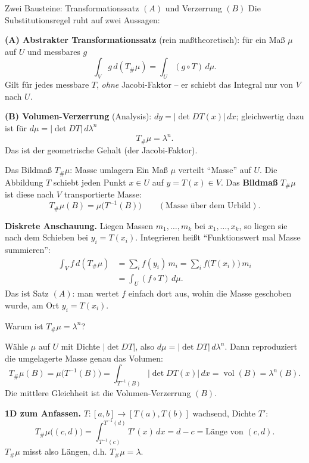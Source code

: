 \documentclass{beamer}
\begin{document}
\begin{frame}{Zwei Bausteine: Transformationssatz \((A)\) und Verzerrung \((B)\)}
Die Substitutionsregel ruht auf zwei Aussagen:

\smallskip
\textbf{(A) Abstrakter Transformationssatz} (rein maßtheoretisch): für ein Maß \(\mu\) auf \(U\) und messbares \(g\)
\[
\int_V g\,d(T_\#\mu)=\int_U (g\circ T)\,d\mu.
\]
Gilt für jedes messbare \(T\), \emph{ohne} Jacobi-Faktor -- er schiebt das Integral nur von \(V\) nach \(U\).

\smallskip
\textbf{(B) Volumen-Verzerrung} (Analysis): \(dy=|\det DT(x)|\,dx\); gleichwertig dazu ist für \(d\mu=|\det DT|\,d\lambda^n\)
\[
T_\#\mu=\lambda^n.
\]
Das ist der geometrische Gehalt (der Jacobi-Faktor).
\end{frame}

\begin{frame}{Das Bildmaß \(T_\#\mu\): Masse umlagern}
Ein Maß \(\mu\) verteilt ``Masse'' auf \(U\). Die Abbildung \(T\) schiebt jeden Punkt \(x\in U\) auf \(y=T(x)\in V\). Das \textbf{Bildmaß} \(T_\#\mu\) ist diese nach \(V\) transportierte Masse:
\[
T_\#\mu(B)=\mu\big(T^{-1}(B)\big)\qquad(\text{Masse über dem Urbild}).
\]

\smallskip
\textbf{Diskrete Anschauung.} Liegen Massen \(m_1,\dots,m_k\) bei \(x_1,\dots,x_k\), so liegen sie nach dem Schieben bei \(y_i=T(x_i)\). Integrieren heißt ``Funktionswert mal Masse summieren'':
\[
\begin{aligned}
\int_V f\,d(T_\#\mu)&=\sum_i f(y_i)\,m_i=\sum_i f\big(T(x_i)\big)\,m_i\\
&=\int_U (f\circ T)\,d\mu.
\end{aligned}
\]
Das ist Satz \((A)\): man wertet \(f\) einfach dort aus, wohin die Masse geschoben wurde, am Ort \(y_i=T(x_i)\).
\end{frame}

\begin{frame}{Warum ist \(T_\#\mu=\lambda^n\)?}
{\small
Wähle \(\mu\) auf \(U\) mit Dichte \(|\det DT|\), also \(d\mu=|\det DT|\,d\lambda^n\). Dann reproduziert die umgelagerte Masse genau das Volumen:
\[
T_\#\mu(B)=\mu\big(T^{-1}(B)\big)=\int_{T^{-1}(B)}|\det DT(x)|\,dx=\operatorname{vol}(B)=\lambda^n(B).
\]
Die mittlere Gleichheit ist die Volumen-Verzerrung \((B)\).

\smallskip
\textbf{1D zum Anfassen.} \(T\colon[a,b]\to[T(a),T(b)]\) wachsend, Dichte \(T'\):
\[
T_\#\mu\big((c,d)\big)=\int_{T^{-1}(c)}^{T^{-1}(d)}T'(x)\,dx=d-c=\text{Länge von }(c,d).
\]
\(T_\#\mu\) misst also Längen, d.h. \(T_\#\mu=\lambda\).
}
\end{frame}
\end{document}
